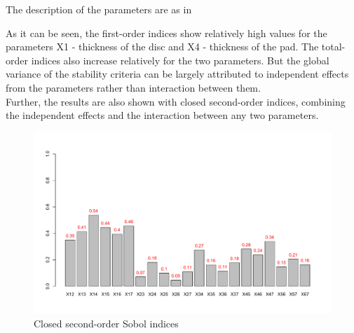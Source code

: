 The description of the parameters are as in  %

As it can be seen, the first-order indices show relatively high values for the parameters X1 - thickness of the disc and X4 - thickness of the pad. The total-order indices also increase relatively for the two parameters. But the global variance of the stability criteria can be largely attributed to independent effects from the parameters rather than interaction between them. \\

Further, the results are also shown with closed second-order indices, combining the independent effects and the interaction between any two parameters.

\begin{figure}
    \centering
    \includegraphics[scale=0.53]{Chapter2/Pictures/second_order_sobol.pdf}
    \caption{Closed second-order Sobol indices}
\end{figure}
